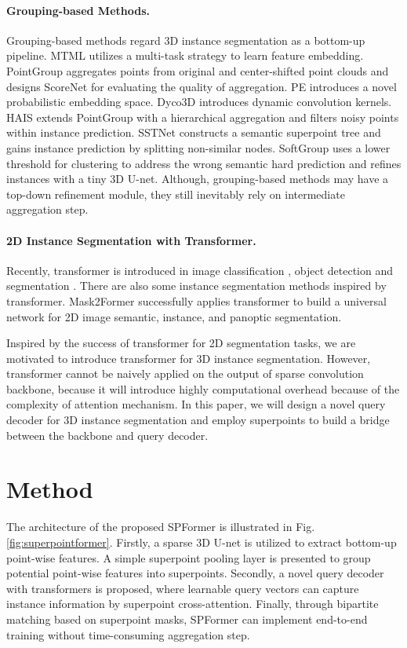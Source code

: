 \documentclass[letterpaper]{article} \usepackage{aaai23}  \usepackage{times}  \usepackage{helvet}  \usepackage{courier}  \usepackage[hyphens]{url}  \usepackage{graphicx} \urlstyle{rm} \def\UrlFont{\rm}  \usepackage{natbib}  \usepackage{caption} \frenchspacing  \setlength{\pdfpagewidth}{8.5in}  \setlength{\pdfpageheight}{11in}  \usepackage{algorithm}
\begin{document}
\paragraph{Grouping-based Methods.} Grouping-based methods regard 3D instance segmentation as a bottom-up pipeline. MTML \cite{mtml} utilizes a multi-task strategy to learn feature embedding. PointGroup \cite{pointgroup} aggregates points from original and center-shifted point clouds and designs ScoreNet for evaluating the quality of aggregation. PE\cite{pe} introduces a novel probabilistic embedding space. Dyco3D\cite{dyco3d} introduces dynamic convolution kernels. HAIS \cite{hais} extends PointGroup with a hierarchical aggregation and filters noisy points within instance prediction. SSTNet \cite{sstnet} constructs a semantic superpoint tree and gains instance prediction by splitting non-similar nodes. SoftGroup \cite{softgroup} uses a lower threshold for clustering to address the wrong semantic hard prediction and refines instances with a tiny 3D U-net. Although, grouping-based methods may have a top-down refinement module, they still inevitably rely on intermediate aggregation step.

\paragraph{2D Instance Segmentation with Transformer.} Recently, transformer \cite{transformer} is introduced in image classification \cite{vit, deit, swin}, object detection \cite{detr, up-detr} and segmentation \cite{maskformer,mask2former,sotr}. There are also some instance segmentation methods \cite{queryinst, sparseinst} inspired by transformer. Mask2Former \cite{mask2former}  successfully applies transformer to build a universal network for 2D image semantic, instance, and panoptic segmentation.

Inspired by the success of transformer for 2D segmentation tasks, we are motivated to introduce transformer for 3D instance segmentation. However, transformer cannot be naively applied on the output of sparse convolution backbone, because it will introduce highly computational overhead because of the complexity of attention mechanism. In this paper, we will design a novel query decoder for 3D instance segmentation and employ superpoints to build a bridge between the backbone and query decoder.

\section{Method}
\label{sec:method}
The architecture of the proposed SPFormer is illustrated in Fig. \ref{fig:superpointformer}. Firstly, a sparse 3D U-net is utilized to extract bottom-up point-wise features. A simple superpoint pooling layer is presented to group potential point-wise features into superpoints. Secondly, a novel query decoder with transformers is proposed, where learnable query vectors can capture instance information by superpoint cross-attention. Finally, through bipartite matching based on superpoint masks, SPFormer can implement end-to-end training without time-consuming aggregation step. 
\end{document}
